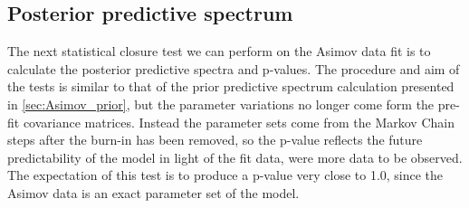 \subsection{Posterior predictive spectrum}
The next statistical closure test we can perform on the Asimov data fit is to calculate the posterior predictive spectra and p-values. The procedure and aim of the tests is similar to that of the prior predictive spectrum calculation presented in \autoref{sec:Asimov_prior}, but the parameter variations no longer come form the pre-fit covariance matrices. Instead the parameter sets come from the Markov Chain steps after the burn-in has been removed, so the p-value reflects the future predictability of the model in light of the fit data, were more data to be observed. The expectation of this test is to produce a p-value very close to 1.0, since the Asimov data is an exact parameter set of the model.

